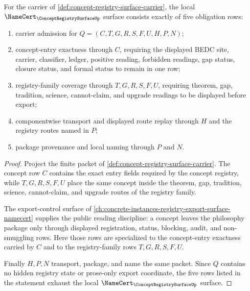 \begin{theorem}
\label{thm:concept-registry-surface-export-exactness}
For the carrier of \autoref{def:concept-registry-surface-carrier}, the local $\NameCert_{\ConceptRegistrySurfaceUp}$ surface consists exactly of five obligation rows:
\begin{enumerate}
\item carrier admission for $Q=(C,T,G,R,S,F,U,H,P,N)$;
\item concept-entry exactness through $C$, requiring the displayed BEDC site, carrier, classifier, ledger, positive reading, forbidden readings, gap status, closure status, and formal status to remain in one row;
\item registry-family coverage through $T,G,R,S,F,U$, requiring theorem, gap, tradition, science, cannot-claim, and upgrade readings to be displayed before export;
\item componentwise transport and displayed route replay through $H$ and the registry routes named in $P$;
\item package provenance and local naming through $P$ and $N$.
\end{enumerate}
\end{theorem}
\begin{proof}
Project the finite packet of \autoref{def:concept-registry-surface-carrier}. The concept row $C$ contains the exact entry fields required by the concept registry, while $T,G,R,S,F,U$ place the same concept inside the theorem, gap, tradition, science, cannot-claim, and upgrade routes of the registry family.

The export-control surface of \autoref{ch:concrete-instances-registry-export-surface-namecert} supplies the public reading discipline: a concept leaves the philosophy package only through displayed registration, status, blocking, audit, and non-smuggling rows. Here those rows are specialized to the concept-entry exactness carried by $C$ and to the registry-family rows $T,G,R,S,F,U$.

Finally $H,P,N$ transport, package, and name the same packet. Since $Q$ contains no hidden registry state or prose-only export coordinate, the five rows listed in the statement exhaust the local $\NameCert_{\ConceptRegistrySurfaceUp}$ surface.
\end{proof}

